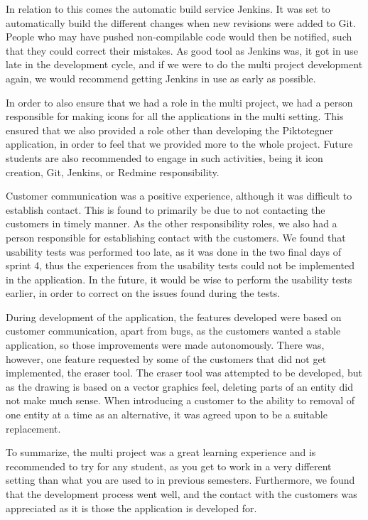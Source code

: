 In relation to this comes the automatic build service Jenkins. 
It was set to automatically build the different changes when new revisions were added to Git. 
People who may have pushed non-compilable code would then be notified, such that they could correct their mistakes.
As good tool as Jenkins was, it got in use late in the development cycle, and if we were to do the multi project development again, we would recommend getting Jenkins in use as early as possible.

In order to also ensure that we had a role in the multi project, we had a person responsible for making icons for all the applications in the multi setting.
This ensured that we also provided a role other than developing the Piktotegner application, in order to feel that we provided more to the whole project. 
Future students are also recommended to engage in such activities, being it icon creation, Git, Jenkins, or Redmine responsibility.

Customer communication was a positive experience, although it was difficult to establish contact.
This is found to primarily be due to not contacting the customers in timely manner.
As the other responsibility roles, we also had a person responsible for establishing contact with the customers.
We found that usability tests was performed too late, as it was done in the two final days of sprint 4, thus the experiences from the usability tests could not be implemented in the application.
In the future, it would be wise to perform the usability tests earlier, in order to correct on the issues found during the tests.

During development of the application, the features developed were based on customer communication, apart from bugs, as the customers wanted a stable application, so those improvements were made autonomously.
There was, however, one feature requested by some of the customers that did not get implemented, the eraser tool.
The eraser tool was attempted to be developed, but as the drawing is based on a vector graphics feel, deleting parts of an entity did not make much sense. 
When introducing a customer to the ability to removal of one entity at a time as an alternative, it was agreed upon to be a suitable replacement.

To summarize, the multi project was a great learning experience and is recommended to try for any student, as you get to work in a very different setting than what you are used to in previous semesters. 
Furthermore, we found that the development process went well, and the contact with the customers was appreciated as it is those the application is developed for.


% 

